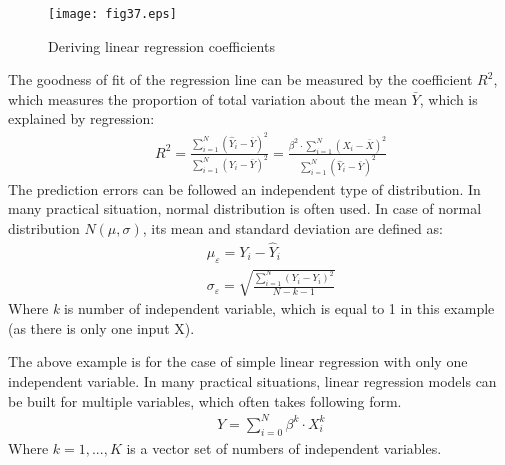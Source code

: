 \begin{figure}[h]
\texttt{[image: fig37.eps]}
\caption{Deriving linear regression coefficients}
\end{figure}

The goodness of fit of the regression line can be measured by the coefficient ${R^2}$, which measures the proportion of total variation about the mean $\bar Y$, which is explained by regression:
\begin{eqnarray}
 && {R^2} = \frac{{\sum\limits_{i = 1}^N {{{({{\hat Y}_i} - \bar Y)}^2}} }}{{\sum\limits_{i = 1}^N {{{({Y_i} - \bar Y)}^2}} }} = \frac{{{\beta ^2} \cdot \sum\limits_{i = 1}^N {{{({X_i} - \bar X)}^2}} }}{{\sum\limits_{i = 1}^N {{{({{\hat Y}_i} - \bar Y)}^2}} }} \label{eq321}
\end{eqnarray}
The prediction errors can be followed an independent type of distribution. In many practical situation, normal distribution is often used. In case of normal distribution $N(\mu ,\sigma )$, its mean and standard deviation are defined as:
\begin{eqnarray}
 && {\mu _\varepsilon } = {Y_i} - {\hat Y_i} \label{eq322}\\
 && {\sigma _\varepsilon } = \sqrt {\frac{{\sum\limits_{i = 1}^N {{{({Y_i} - {Y_i})}^2}} }}{{N - k - 1}}}
\end{eqnarray}
Where \textit{k} is number of independent variable, which is equal to 1 in this example (as there is only one input X).

The above example is for the case of simple linear regression with only one independent variable. In many practical situations, linear regression models can be built for multiple variables, which often takes following form.
\begin{eqnarray}
 && Y = \sum\limits_{i = 0}^N {\beta _{}^k}  \cdot X_i^k \label{eq3223}
\end{eqnarray}
Where $k = 1,...,K$ is a vector set of numbers of independent variables. 
